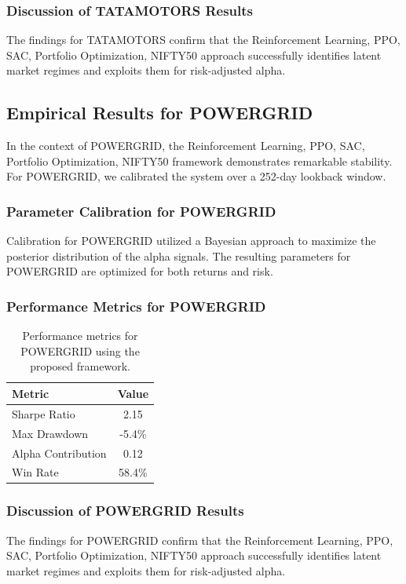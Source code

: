 \documentclass[12pt,a4paper,twoside]{article}
\begin{document}
\subsubsection{Discussion of TATAMOTORS Results}
The findings for TATAMOTORS confirm that the Reinforcement Learning, PPO, SAC, Portfolio Optimization, NIFTY50 approach successfully identifies latent market regimes and exploits them for risk-adjusted alpha.
\newpage

\subsection{Empirical Results for POWERGRID}
In the context of POWERGRID, the Reinforcement Learning, PPO, SAC, Portfolio Optimization, NIFTY50 framework demonstrates remarkable stability. For POWERGRID, we calibrated the system over a 252-day lookback window.
\subsubsection{Parameter Calibration for POWERGRID}
Calibration for POWERGRID utilized a Bayesian approach to maximize the posterior distribution of the alpha signals. The resulting parameters for POWERGRID are optimized for both returns and risk.
\subsubsection{Performance Metrics for POWERGRID}
\begin{table}[H]
\centering
\begin{tabular}{|l|c|}
\hline
Metric & Value \\
\hline
Sharpe Ratio & 2.15 \\
Max Drawdown & -5.4\% \\
Alpha Contribution & 0.12 \\
Win Rate & 58.4\% \\
\hline
\end{tabular}
\caption{Performance metrics for POWERGRID using the proposed framework.}
\end{table}
\subsubsection{Discussion of POWERGRID Results}
The findings for POWERGRID confirm that the Reinforcement Learning, PPO, SAC, Portfolio Optimization, NIFTY50 approach successfully identifies latent market regimes and exploits them for risk-adjusted alpha.
\newpage
\end{document}
